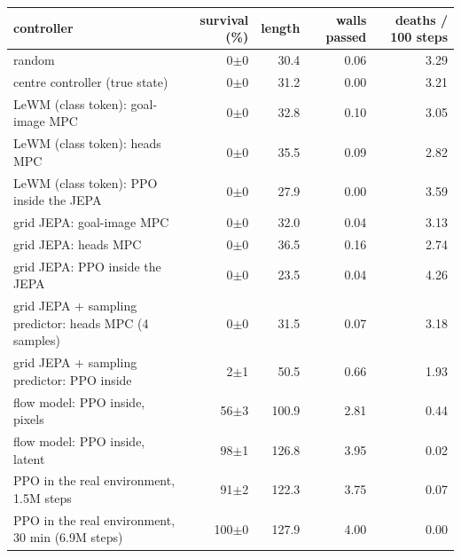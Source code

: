 \begin{tabular}{lrrrr}
\toprule
controller & survival (\%) & length & walls passed & deaths / 100 steps \\
\midrule
random & 0$\pm$0 & 30.4 & 0.06 & 3.29 \\
centre controller (true state) & 0$\pm$0 & 31.2 & 0.00 & 3.21 \\
LeWM (class token): goal-image MPC & 0$\pm$0 & 32.8 & 0.10 & 3.05 \\
LeWM (class token): heads MPC & 0$\pm$0 & 35.5 & 0.09 & 2.82 \\
LeWM (class token): PPO inside the JEPA & 0$\pm$0 & 27.9 & 0.00 & 3.59 \\
grid JEPA: goal-image MPC & 0$\pm$0 & 32.0 & 0.04 & 3.13 \\
grid JEPA: heads MPC & 0$\pm$0 & 36.5 & 0.16 & 2.74 \\
grid JEPA: PPO inside the JEPA & 0$\pm$0 & 23.5 & 0.04 & 4.26 \\
grid JEPA + sampling predictor: heads MPC (4 samples) & 0$\pm$0 & 31.5 & 0.07 & 3.18 \\
grid JEPA + sampling predictor: PPO inside & 2$\pm$1 & 50.5 & 0.66 & 1.93 \\
flow model: PPO inside, pixels & 56$\pm$3 & 100.9 & 2.81 & 0.44 \\
flow model: PPO inside, latent & 98$\pm$1 & 126.8 & 3.95 & 0.02 \\
PPO in the real environment, 1.5M steps & 91$\pm$2 & 122.3 & 3.75 & 0.07 \\
PPO in the real environment, 30 min (6.9M steps) & 100$\pm$0 & 127.9 & 4.00 & 0.00 \\
\bottomrule
\end{tabular}

